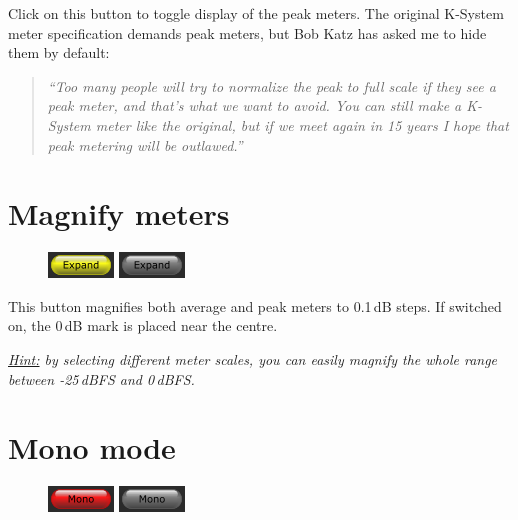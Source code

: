 Click on this button to toggle display of the peak meters.  The
original K-System meter specification demands peak meters, but Bob
Katz has asked me to hide them by default:

\begin{quotation}
  \emph{``Too many people will try to normalize the peak to full scale
    if they see a peak meter, and that's what we want to avoid.  You
    can still make a K-System meter like the original, but if we meet
    again in 15 years I hope that peak metering will be outlawed.''}
\end{quotation}

\section{Magnify meters}

\begin{figure}
  \includegraphics[scale=\screenshotscale,clip]{include/images/button_expand_meter_on.png}
  \newline \vspace{-0.9\baselineskip}
  \includegraphics[scale=\screenshotscale,clip]{include/images/button_expand_meter_off.png}
\end{figure}

This button magnifies both average and peak meters to 0.1\,dB steps.
If switched on, the 0\,dB mark is placed near the centre.

\emph{\underline{Hint:} by selecting different meter scales, you can
  easily magnify the whole range between -25\,dBFS and 0\,dBFS.}

\section{Mono mode}

\begin{figure}
  \includegraphics[scale=\screenshotscale,clip]{include/images/button_mono_on.png}
  \newline \vspace{-0.9\baselineskip}
  \includegraphics[scale=\screenshotscale,clip]{include/images/button_mono_off.png}
\end{figure}

